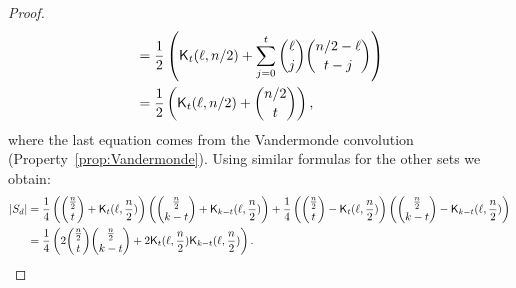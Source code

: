 \documentclass[11pt]{llncs}
\begin{document}
\begin{proof}
\begin{align*}
&=\frac{1}{2}\left( \mathsf{K}_{t}(\ell,n/2) + \sum_{j=0}^{t} \binom{\ell}{j} \binom{n/2-\ell}{t-j} \right)\\
&=\frac{1}{2}\left( \mathsf{K}_{t}(\ell,n/2) + \binom{n/2}{t} \right),
\end{align*}
where the last equation comes from the Vandermonde convolution (Property~\ref{prop:Vandermonde}). Using similar formulas for the other sets we obtain:
\begin{align*}
|S_d|&=\frac{1}{4}\left( \binom{\frac{n}{2}}{t} + \mathsf{K}_{t}(\ell,\frac{n}{2}) \right)\left( \binom{\frac{n}{2}}{k-t} + \mathsf{K}_{k-t}(\ell,\frac{n}{2}) \right)
+ \frac{1}{4}\left( \binom{\frac{n}{2}}{t} - \mathsf{K}_{t}(\ell,\frac{n}{2}) \right)\left( \binom{\frac{n}{2}}{k-t} - \mathsf{K}_{k-t}(\ell,\frac{n}{2}) \right)\\
&=\frac{1}{4} \left(2 \binom{\frac{n}{2}}{t} \binom{\frac{n}{2}}{k-t} + 2 \mathsf{K}_{t}(\ell,\frac{n}{2}) \mathsf{K}_{k-t}(\ell,\frac{n}{2})\right).
\end{align*}


\end{proof}
\end{document}

